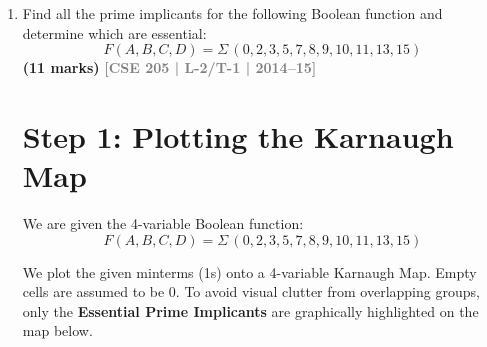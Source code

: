 \documentclass[12pt,a3paper]{article}
\newcommand{\yr}[1]{\hfill\textcolor{gray}{\small\textbf{[#1]}}}
\newcommand{\mk}[1]{\textcolor{orange!70!black}{\small\textbf{(#1 marks)}}}
\begin{document}
\begin{enumerate}
\begin{tcolorbox}[enhanced,breakable,ansbox,colback=cC!4,colframe=cC,boxrule=0.8pt,arc=5pt,title={\textbf{Answer}},fonttitle=\bfseries\color{white},colbacktitle=cC]
\begin{enumerate}
    \item \textbf{Group 3 (Overlapping Middle):} Minterms $(4, 5, 12, 13)$.
    \begin{itemize}
        \item It is a maximally sized $2 \times 2$ square. It is a \textbf{Prime Implicant}.
        \item However, look closely at its minterms: $4$ and $5$ are already covered by Group 1. $12$ and $13$ are already covered by Group 2.
        \item It does \textit{not} contain any unique minterm. 
        \item Therefore, this is a \textbf{\textcolor{cC}{Prime Implicant, but NOT an Essential Prime Implicant}}. It represents redundant hardware and is discarded in the final answer. (Equation: $BC'$)
    \end{itemize}
\end{enumerate}

\textbf{Final Minimized Function (Using only EPIs):}
\begin{equation}
    F_{minimized} = A'C' + AB
\end{equation}

\end{tcolorbox}

\item Find all the prime implicants for the following Boolean function and determine which are essential:
\[ F(A, B, C, D) = \Sigma\,(0, 2, 3, 5, 7, 8, 9, 10, 11, 13, 15) \]
\mk{11} \yr{CSE 205 | L-2/T-1 | 2014--15}

\begin{tcolorbox}[enhanced,breakable,ansbox,colback=cC!4,colframe=cC,boxrule=0.8pt,arc=5pt,title={\textbf{Answer}},fonttitle=\bfseries\color{white},colbacktitle=cC]

\section*{Step 1: Plotting the Karnaugh Map}

We are given the 4-variable Boolean function:
\begin{equation*}
    F(A, B, C, D) = \Sigma\,(0, 2, 3, 5, 7, 8, 9, 10, 11, 13, 15)
\end{equation*}

We plot the given minterms (1s) onto a 4-variable Karnaugh Map. Empty cells are assumed to be 0. To avoid visual clutter from overlapping groups, only the \textbf{Essential Prime Implicants} are graphically highlighted on the map below.


\end{tcolorbox}
\end{enumerate}
\end{document}

